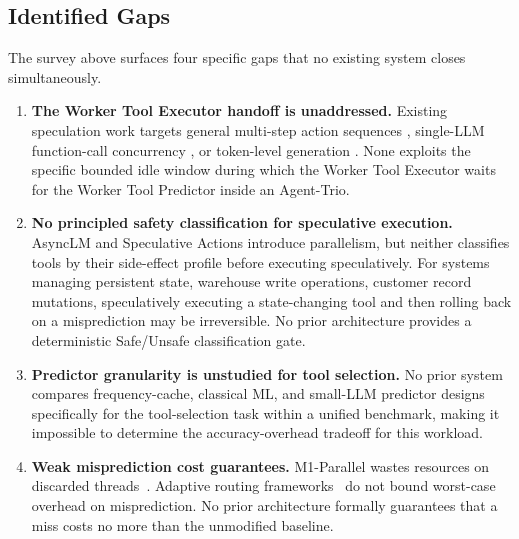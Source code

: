 \documentclass[conference]{IEEEtran}
\begin{document}
\subsection{Identified Gaps}
\label{sec:gaps}
The survey above surfaces four specific gaps that no existing system closes
simultaneously.
\begin{enumerate}
\item \textbf{The Worker Tool Executor handoff is unaddressed.}
Existing speculation work targets general multi-step action sequences
\cite{ye2025speculative, guan2025dsp}, single-LLM function-call concurrency
\cite{gim2024asynclm}, or token-level generation
\cite{leviathan2023speculative, cai2024medusa}.
None exploits the specific bounded idle window during which the Worker Tool
Executor waits for the Worker Tool Predictor inside an Agent-Trio.
\item \textbf{No principled safety classification for speculative execution.}
AsyncLM and Speculative Actions introduce parallelism, but neither classifies
tools by their side-effect profile before executing speculatively.
For systems managing persistent state, warehouse write operations, customer
record mutations, speculatively executing a state-changing tool and then
rolling back on a misprediction may be irreversible.
No prior architecture provides a deterministic Safe/Unsafe classification gate.
\item \textbf{Predictor granularity is unstudied for tool selection.}
No prior system compares frequency-cache, classical ML, and small-LLM predictor
designs specifically for the tool-selection task within a unified benchmark,
making it impossible to determine the accuracy-overhead tradeoff for this workload.
\item \textbf{Weak misprediction cost guarantees.}
M1-Parallel wastes resources on discarded threads~\cite{xiao2025m1parallel}.
Adaptive routing frameworks~\cite{saha2025system1x, guan2025dsp} do not bound
worst-case overhead on misprediction.
No prior architecture formally guarantees that a miss costs no more than the
unmodified baseline.
\end{enumerate}

\end{document}
